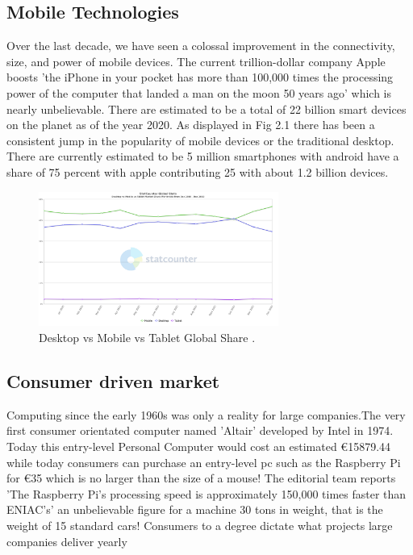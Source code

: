\subsection{Mobile Technologies}
Over the last decade, we have seen a colossal improvement in the connectivity, size, and power of mobile devices. The current trillion-dollar company Apple boosts 'the iPhone in your pocket has more than 100,000 times the processing power of the computer that landed a man on the moon 50 years ago' which is nearly unbelievable.
There are estimated to be a total of 22 billion smart devices on the planet as of the year 2020. As displayed in Fig 2.1 there has been a consistent jump in the popularity of mobile devices or the traditional desktop. There are currently estimated to be 5 million smartphones with android have a share of 75 percent with apple contributing 25 with about  1.2 billion devices.
\begin{figure}[h!]
  \centering
    \includegraphics[width=0.7\textwidth]{Research-Latex/images/marketSharePC-Desktop.png}
     \caption{Desktop vs Mobile vs Tablet Global Share .}
\end{figure}

\subsection{Consumer  driven market }

Computing since the early 1960s was only a reality for large companies.The very first consumer orientated computer named 'Altair' developed by Intel in 1974. Today this entry-level Personal Computer would cost an estimated  €15879.44 while today consumers can purchase an entry-level pc such as the Raspberry Pi for €35 which is no larger than the size of a mouse! The editorial team reports 'The Raspberry Pi’s processing speed is approximately 150,000 times faster than ENIAC’s' an unbelievable figure for a machine 30 tons in weight, that is the weight of 15 standard cars! Consumers to a degree dictate what projects large companies deliver yearly

